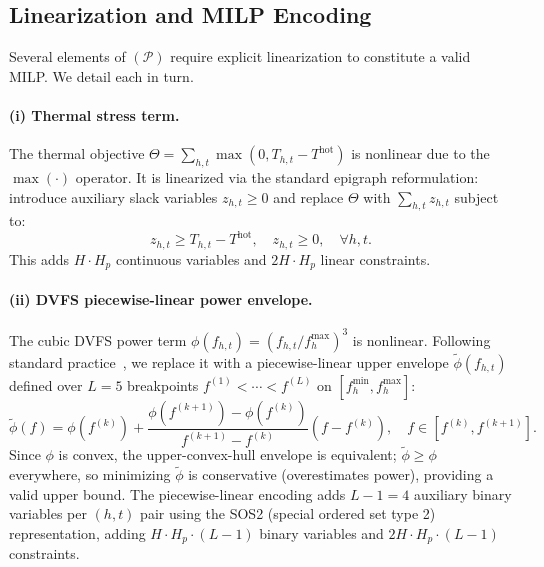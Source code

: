 \documentclass[a4paper,fleqn]{cas-dc}
\begin{document}
\subsection{Linearization and MILP Encoding}
\label{sec:milp_encoding}

Several elements of $(\mathcal{P})$ require explicit linearization to constitute a valid MILP. We detail each in turn.

\paragraph{(i) Thermal stress term.}
The thermal objective $\Theta = \sum_{h,t} \max(0, T_{h,t} - T^{\mathrm{hot}})$ is nonlinear due to the $\max(\cdot)$ operator. It is linearized via the standard epigraph reformulation: introduce auxiliary slack variables $z_{h,t} \geq 0$ and replace $\Theta$ with $\sum_{h,t} z_{h,t}$ subject to:
\begin{equation}
z_{h,t} \geq T_{h,t} - T^{\mathrm{hot}}, \quad z_{h,t} \geq 0, \quad \forall h, t.
\end{equation}
This adds $H \cdot H_p$ continuous variables and $2H \cdot H_p$ linear constraints.

\paragraph{(ii) DVFS piecewise-linear power envelope.}
The cubic DVFS power term $\phi(f_{h,t}) = (f_{h,t}/f^{\max}_h)^3$ is nonlinear. Following standard practice~\cite{ref-nemirovski06}, we replace it with a piecewise-linear upper envelope $\tilde{\phi}(f_{h,t})$ defined over $L=5$ breakpoints $f^{(1)} < \cdots < f^{(L)}$ on $[f^{\min}_h, f^{\max}_h]$:
\begin{equation}
\tilde{\phi}(f) = \phi(f^{(k)}) + \frac{\phi(f^{(k+1)})-\phi(f^{(k)})}{f^{(k+1)}-f^{(k)}}(f - f^{(k)}), \quad f \in [f^{(k)}, f^{(k+1)}].
\end{equation}
Since $\phi$ is convex, the upper-convex-hull envelope is equivalent; $\tilde{\phi} \geq \phi$ everywhere, so minimizing $\tilde{\phi}$ is conservative (overestimates power), providing a valid upper bound. The piecewise-linear encoding adds $L-1=4$ auxiliary binary variables per $(h,t)$ pair using the SOS2 (special ordered set type 2) representation, adding $H \cdot H_p \cdot (L-1)$ binary variables and $2H \cdot H_p \cdot (L-1)$ constraints.
\end{document}
